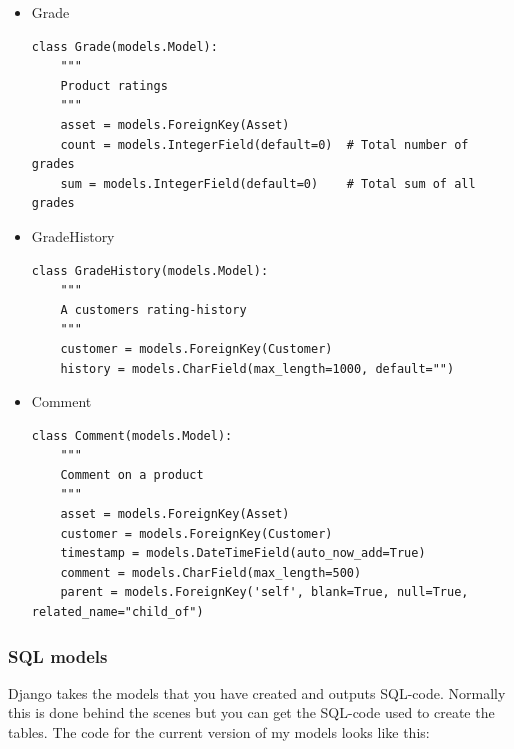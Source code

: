 \documentclass[12pt, a4paper,titlepage]{article}
\begin{document}
\begin{itemize}
\item Grade
\begin{lstlisting}
class Grade(models.Model):
    """
    Product ratings
    """
    asset = models.ForeignKey(Asset)
    count = models.IntegerField(default=0)  # Total number of grades
    sum = models.IntegerField(default=0)    # Total sum of all grades
\end{lstlisting}

\item GradeHistory
\begin{lstlisting}
class GradeHistory(models.Model):
    """
    A customers rating-history
    """
    customer = models.ForeignKey(Customer)
    history = models.CharField(max_length=1000, default="")
\end{lstlisting}

\newpage
\item Comment
\begin{lstlisting}
class Comment(models.Model):
    """
    Comment on a product
    """
    asset = models.ForeignKey(Asset)
    customer = models.ForeignKey(Customer)
    timestamp = models.DateTimeField(auto_now_add=True)
    comment = models.CharField(max_length=500)
    parent = models.ForeignKey('self', blank=True, null=True, related_name="child_of")
\end{lstlisting}

\end{itemize}

\subsubsection{SQL models}
\label{sec:sqlmodels}
Django takes the models that you have created and outputs SQL-code.
Normally this is done behind the scenes but you can get the SQL-code used
to create the tables. The code for the current version of my models looks like
this:
\end{document}
